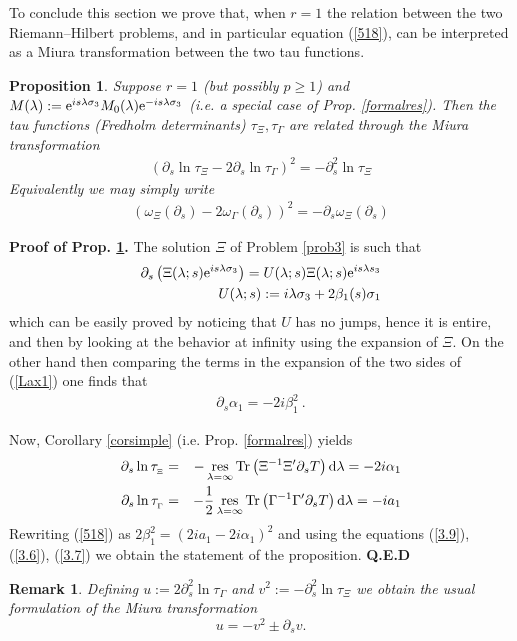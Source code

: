 \documentclass{article}
\newtheorem{prop}{Proposition}[section]
\newtheorem{remark}{Remark}[section]
\def\b{\beta}
\def\s{\sigma}
\def\d{{\rm d}}
\def\a{{\alpha}}
\def \pa{\partial}
\def\res{\mathop{{\rm res}}}
\def\Tr{\mathop{{\rm Tr}}}
\def\QED{ {\bf Q.E.D}\par \vskip 4pt}
\newcommand{\be}{\begin{eqnarray}}
\newcommand{\ee}{\end{eqnarray}}
\def\le{\left}
\def\ri{\right}
\begin{document}
To conclude this section we prove that, when $r=1$ the relation between the two Riemann--Hilbert problems, and in particular equation (\ref{518}), can be interpreted as a Miura transformation between the two tau functions. 
\begin{prop}
\label{taumiura}
Suppose  $r=1$ (but possibly $p\geq 1$) and $M(\lambda):={\rm e}^{is\lambda\s_3}M_0(\lambda){\rm e}^{-is\lambda\s_3}$ (i.e. a special case of Prop. \ref{formalres}). Then the tau functions (Fredholm determinants)  $\tau_\Xi,\tau_\Gamma$ are related through the Miura transformation
	\be\label{Miura}
		\le(\pa_s\ln\tau_{\Xi}-2\pa_s \ln \tau_{\Gamma}\ri)^2 = -\pa_s^2 \ln \tau_{\Xi}
	\ee
Equivalently we may simply write 
\be
\le( \omega _\Xi(\pa_s)  - 2 \omega_\Gamma(\pa_s) \ri) ^2= -\pa_s \omega_\Xi(\pa_s)
\ee	
\end{prop}
{\bf Proof of Prop. \ref{taumiura}.}
The solution $\Xi$ of Problem \ref{prob3} is such that 
\be
\pa_s \le(\Xi(\lambda;s){\rm e}^{is \lambda \s_3}\ri) = U (\lambda;s)\Xi(\lambda;s){\rm e}^{is\lambda s_3}\label{Lax1}\\
U(\lambda;s):= i\lambda \s_3 + 2\b_1(s) \s_1
\ee 
which can be easily proved by noticing that $U$ has no jumps, hence it is entire, and then by looking at the behavior at infinity using the expansion of $\Xi$. On the other hand then comparing the terms in the expansion of the two sides of (\ref{Lax1}) one finds that 
\be
\pa_s \a_1 = -2i \b_1^2\label{3.9}\ .
\ee

Now, Corollary \ref{corsimple} (i.e. Prop. \ref{formalres}) yields
\be
\pa_s\ln \tau_{_\Xi} &=& -\res_{\lambda=\infty} \Tr\le(\Xi^{-1} \Xi' \pa_s T\ri) \d\lambda =-2i\a_1\label{3.6}\\
\pa_s\ln \tau_{_\Gamma} &=& -\frac 12 \res_{\lambda=\infty} \Tr\le(\Gamma^{-1} \Gamma' \pa_s T\ri) {\d\lambda} = -ia_1\label{3.7}
\ee
Rewriting (\ref{518}) as 
$
	2\b_1^2= (2ia_1 -2i\a_1)^2 
$
and using the equations  (\ref{3.9}), (\ref{3.6}), (\ref{3.7}) we obtain the statement of the proposition. \QED
\begin{remark}\label{remMiu}
	Defining $u:=2\pa_s^2\ln\tau_{\Gamma}$ and $v^2:=-\pa_s^2\ln\tau_{\Xi}$ we obtain the usual formulation of the Miura transformation
	$$u=-v^2\pm \pa_s v.$$
\end{remark}
\end{document}
